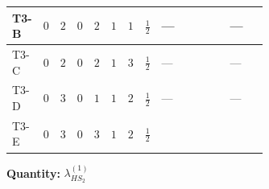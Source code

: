 \documentclass[8pt]{article}
\begin{document}
\begin{landscape}
\begin{longtable}{@{}llcccccc >{\raggedright\arraybackslash}p{0.21\linewidth} >{\raggedright\arraybackslash}p{0.21\linewidth} >{\raggedright\arraybackslash}p{0.21\linewidth}@{}}
\midrule
T3-B & $0$ & $2$ & $0$ & $2$ & $1$ & $1$ & $\frac{1}{2}$ & --- & \scriptsize\adjustbox{max width=\linewidth}{$\begin{gathered} +6 {\lambda_5} \left({\lambda_5}\right)^{*}\end{gathered}$} & --- \\
\midrule
T3-C & $0$ & $2$ & $0$ & $2$ & $1$ & $3$ & $\frac{1}{2}$ & --- & \scriptsize\adjustbox{max width=\linewidth}{$\begin{gathered} +6 {\lambda_5} \left({\lambda_5}\right)^{*}\end{gathered}$} & --- \\
\midrule
T3-D & $0$ & $3$ & $0$ & $1$ & $1$ & $2$ & $\frac{1}{2}$ & --- & \scriptsize\adjustbox{max width=\linewidth}{$\begin{gathered} +12 {\lambda_5} \left({\lambda_5}\right)^{*}\end{gathered}$} & --- \\
\midrule
T3-E & $0$ & $3$ & $0$ & $3$ & $1$ & $2$ & $\frac{1}{2}$ & \scriptsize\adjustbox{max width=\linewidth}{$\begin{gathered} {\lambda_{HS_2}^{(1)}} (6 \operatorname{Tr}\!\left({Y_d}\,\left({Y_d}\right)^{\dagger}\right)+2 \operatorname{Tr}\!\left({Y_e}\,\left({Y_e}\right)^{\dagger}\right)+6 \operatorname{Tr}\!\left({Y_u}\,\left({Y_u}\right)^{\dagger}\right)+4 {\lambda_{S_2}^{(A)}})\end{gathered}$} & \scriptsize\adjustbox{max width=\linewidth}{$\begin{gathered} +4 {\lambda_5} \left({\lambda_5}\right)^{*}\end{gathered}$} & \scriptsize\adjustbox{max width=\linewidth}{$\begin{gathered} +6 {g_2}^4\end{gathered}$} \\
\midrule
\bottomrule
\end{longtable}
\clearpage
\noindent\textbf{Quantity: }$\lambda_{HS_2}^{(1)}$\par\smallskip

\end{landscape}
\end{document}
